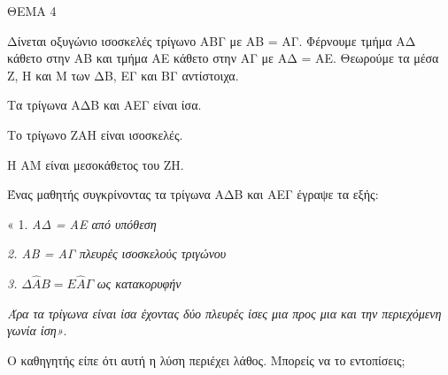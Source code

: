 
ΘΕΜΑ 4

Δίνεται οξυγώνιο ισοσκελές τρίγωνο ΑΒΓ με ΑΒ = ΑΓ. Φέρνουμε τμήμα ΑΔ κάθετο στην ΑΒ και τμήμα ΑΕ κάθετο στην ΑΓ με ΑΔ = ΑΕ. Θεωρούμε τα μέσα Ζ, Η και Μ των ΔΒ, ΕΓ και ΒΓ αντίστοιχα.

\begin{alist}
\item Να αποδείξετε ότι:

.}
\end{alist}
\begin{alist}
\item
  Τα τρίγωνα ΑΔΒ και ΑΕΓ είναι ίσα. 
\item
  Το τρίγωνο ΖΑΗ είναι ισοσκελές. 
\item
  Η ΑΜ είναι μεσοκάθετος του ΖΗ. 

\item Ένας μαθητής συγκρίνοντας τα τρίγωνα ΑΔΒ και ΑΕΓ έγραψε τα εξής:

« 1. \emph{ΑΔ = ΑΕ από υπόθεση}

\emph{2. ΑΒ = ΑΓ πλευρές ισοσκελούς τριγώνου}

\emph{3.} $\Delta\widehat{Α}Β = Ε\widehat{Α}\Gamma$ \emph{ως κατακορυφήν}

\emph{Άρα τα τρίγωνα είναι ίσα έχοντας δύο πλευρές ίσες μια προς μια και την περιεχόμενη γωνία ίση»}.

Ο καθηγητής είπε ότι αυτή η λύση περιέχει λάθος. Μπορείς να το εντοπίσεις; 


\end{alist}
